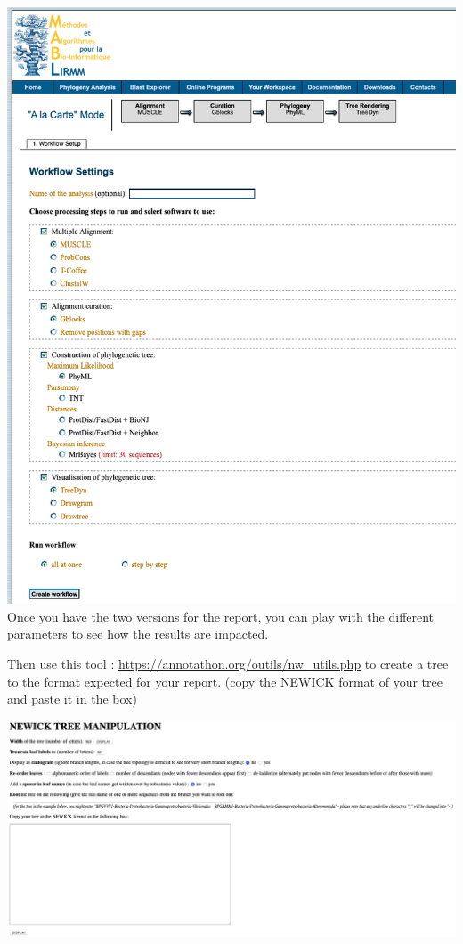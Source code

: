 \documentclass[
]{book}
\begin{document}
\includegraphics{figures/Annotathon/Annot_phylogeny_alacarte.png}
Once you have the two versions for the report, you can play with the different parameters to see how the results are impacted.

Then use this tool : \url{https://annotathon.org/outils/nw_utils.php}
to create a tree to the format expected for your report. (copy the NEWICK format of your tree and paste it in the box)

\includegraphics{figures/Annotathon/Annot_newick_to_annot_tree.png}
\end{document}
